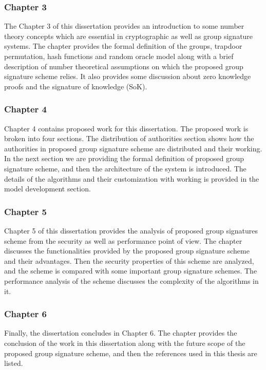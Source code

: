 \subsubsection{Chapter 3}
The Chapter 3 of this dissertation provides an introduction to some number theory concepts which are essential in cryptographic as well as group signature systems. The chapter provides the formal definition of the groups, trapdoor permutation, hash functions and random oracle model along with a brief description of number theoretical assumptions on which the proposed group signature scheme relies. It also provides some discussion about zero knowledge proofs and the signature of knowledge (SoK).
\subsubsection{Chapter 4}
Chapter 4 contains proposed work for this dissertation. The proposed work is broken into four sections. The distribution of authorities section shows how the authorities in proposed group signature scheme are distributed and their working.  In the next section we are providing the formal definition of proposed group signature scheme, and then the architecture of the system is introduced. The details of the algorithms and their customization with working is provided in the model development section.

\subsubsection{Chapter 5}
Chapter 5 of this dissertation provides the analysis of proposed group signatures scheme from the security as well as performance point of view. The chapter discusses the functionalities provided by the proposed group signature scheme and their advantages. Then the security properties of this scheme are analyzed, and the scheme is compared with some important group signature schemes. The performance analysis of the scheme discusses the complexity of the algorithms in it.

\subsubsection{Chapter 6}
Finally, the dissertation concludes in Chapter 6. The chapter provides the conclusion of the work in this dissertation along with the future scope of the proposed group signature scheme, and then the references used in this thesis are listed.